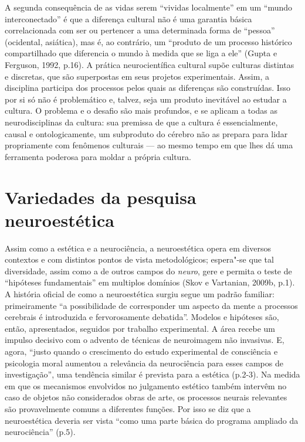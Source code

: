A segunda consequência de as vidas serem ``vividas localmente'' em um
``mundo interconectado'' é que a diferença cultural não é uma garantia
básica correlacionada com ser ou pertencer a uma determinada forma de
``pessoa'' (ocidental, asiática), mas é, ao contrário, um ``produto de
um processo histórico compartilhado que diferencia o mundo à medida que
se liga a ele'' (Gupta e Ferguson, 1992, p.16). A prática
neurocientífica cultural supõe culturas distintas e discretas, que são
superpostas em seus projetos experimentais. Assim, a disciplina
participa dos processos pelos quais as diferenças são construídas. Isso
por si só não é problemático e, talvez, seja um produto inevitável ao
estudar a cultura. O problema e o desafio são mais profundos, e se
aplicam a todas as neurodisciplinas da cultura: sua premissa de que a
cultura é essencialmente, causal e ontologicamente, um subproduto do
cérebro não as prepara para lidar propriamente com fenômenos culturais
--- ao mesmo tempo em que lhes dá uma ferramenta poderosa para moldar a
própria cultura.

\chapter{Variedades da pesquisa neuroestética}

Assim como a estética e a neurociência, a neuroestética opera em
diversos contextos e com distintos pontos de vista metodológicos;
espera"-se que tal diversidade, assim como a de outros campos do
\emph{neuro}, gere e permita o teste de ``hipóteses fundamentais'' em
multiplos domínios (Skov e Vartanian, 2009b, p.1). A história oficial de
como a neuroestética surgiu segue um padrão familiar: primeiramente ``a
possibilidade de corresponder um aspecto da mente a processos cerebrais
é introduzida e fervorosamente debatida''. Modelos e hipóteses são,
então, apresentados, seguidos por trabalho experimental. A área recebe
um impulso decisivo com o advento de técnicas de neuroimagem não
invasivas. E, agora, ``justo quando o crescimento do estudo experimental
de consciência e psicologia moral aumentou a relevância da neurociência
para esses campos de investigação'', uma tendência similar é prevista
para a estética (p.2-3). Na medida em que os mecanismos envolvidos no
julgamento estético também intervêm no caso de objetos não considerados
obras de arte, os processos neurais relevantes são provavelmente comuns
a diferentes funções. Por isso se diz que a neuroestética deveria ser
vista ``como uma parte básica do programa ampliado da neurociência''
(p.5).

